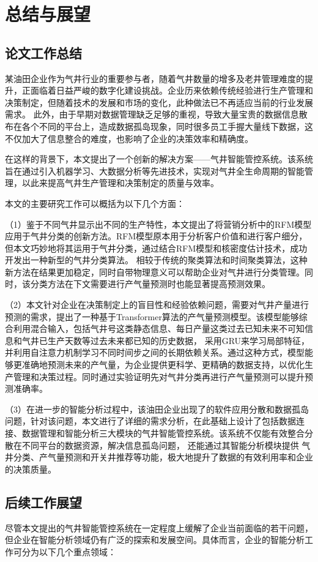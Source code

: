 \chapter{总结与展望}
\section{论文工作总结}
某油田企业作为气井行业的重要参与者，随着气井数量的增多及老井管理难度的提升，正面临着日益严峻的数字化建设挑战。企业历来依赖传统经验进行生产管理和决策制定，但随着技术的发展和市场的变化，此种做法已不再适应当前的行业发展需求。
此外，由于早期对数据管理缺乏足够的重视，导致大量宝贵的数据信息散布在各个不同的平台上，造成数据孤岛现象，同时很多员工手握大量线下数据，这不仅加大了信息整合的难度，也影响了企业的决策效率和精确度。

在这样的背景下，本文提出了一个创新的解决方案——气井智能管控系统。该系统旨在通过引入机器学习、大数据分析等先进技术，实现对气井全生命周期的智能管理，以此来提高气井生产管理和决策制定的质量与效率。

本文的主要研究工作可以概括为以下几个方面：

（1）鉴于不同气井显示出不同的生产特性，本文提出了将营销分析中的RFM模型应用于气井分类的创新方法。RFM模型原本用于分析客户价值和进行客户细分，但本文巧妙地将其运用于气井分类，通过结合RFM模型和核密度估计技术，成功开发出一种新型的气井分类算法。
相较于传统的聚类算法和时间聚类算法，这种新方法在结果更加稳定，同时自带物理意义可以帮助企业对气井进行分类管理。同时，该分类方法在下文需要进行产气量预测时也能显著提高预测效果。

（2）本文针对企业在决策制定上的盲目性和经验依赖问题，需要对气井产量进行预测的需求，提出了一种基于Transformer算法的产气量预测模型。该模型能够综合利用混合输入，包括气井号这类静态信息、每日产量这类过去已知未来不可知信息和气井已生产天数等过去未来都已知的历史数据，
采用GRU来学习局部特征，并利用自注意力机制学习不同时间步之间的长期依赖关系。通过这种方式，模型能够更准确地预测未来的产气量，为企业提供更科学、更精确的数据支持，以优化生产管理和决策过程。同时通过实验证明先对气井分类再进行产气量预测可以提升预测准确率。

（3）在进一步的智能分析过程中，该油田企业出现了的软件应用分散和数据孤岛问题，针对该问题，本文进行了详细的需求分析，在此基础上设计了包括数据连接、数据管理和智能分析三大模块的气井智能管控系统。该系统不仅能有效整合分散在不同平台的数据资源，解决信息孤岛问题，
还能通过其智能分析模块提供
气井分类、产气量预测和开关井推荐等功能，极大地提升了数据的有效利用率和企业的决策质量。
\section{后续工作展望}
尽管本文提出的气井智能管控系统在一定程度上缓解了企业当前面临的若干问题，但企业在智能分析领域仍有广泛的探索和发展空间。具体而言，企业的智能分析工作可分为以下几个重点领域：

